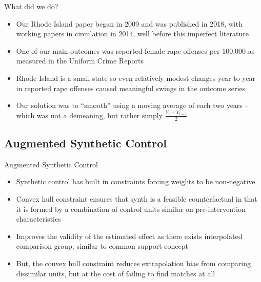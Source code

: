 \documentclass{beamer}
\begin{document}
\begin{frame}{What did we do?}

\begin{itemize}
\item Our Rhode Island paper began in 2009 and was published in 2018, with working papers in circulation in 2014, well before this imperfect literature
\item One of our main outcomes was reported female rape offenses per 100,000 as measured in the Uniform Crime Reports 
\item Rhode Island is a small state so even relatively modest changes year to year in reported rape offenses caused meaningful swings in the outcome series
\item Our solution was to ``smooth'' using a moving average of each two years -- which was not a demeaning, but rather simply $\frac{Y_t + Y_{t+1}}{2}$
\end{itemize}

\end{frame}





\subsection{Augmented Synthetic Control}

\begin{frame}{Augmented Synthetic Control}
\begin{itemize}
\item Synthetic control has built in constraints forcing weights to be non-negative
\item Convex hull constraint ensures that synth is a feasible counterfactual in that it is formed by a combination of control units similar on pre-intervention characteristics
\item Improves the validity of the estimated effect as there exists interpolated comparison group; similar to common support concept
\item But, the convex hull constraint reduces extrapolation bias from comparing dissimilar units, but at the cost of failing to find matches at all
\end{itemize}

\end{frame}
\end{document}
